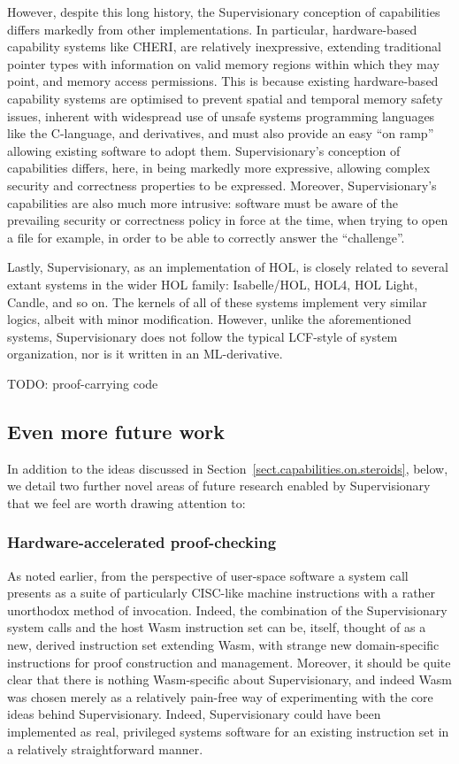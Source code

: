 \documentclass[a4paper, UKenglish, cleveref, autoref, thm-restate, colorlinks]{lipics-v2021}
\newcommand{\todo}[1]{}
\renewcommand{\todo}[1]{{\color{red} TODO: {#1}}}
\begin{document}
However, despite this long history, the Supervisionary conception of capabilities differs markedly from other implementations.
In particular, hardware-based capability systems like CHERI, are relatively inexpressive, extending traditional pointer types with information on valid memory regions within which they may point, and memory access permissions.
This is because existing hardware-based capability systems are optimised to prevent spatial and temporal memory safety issues, inherent with widespread use of unsafe systems programming languages like the C-language, and derivatives, and must also provide an easy ``on ramp'' allowing existing software to adopt them.
Supervisionary's conception of capabilities differs, here, in being markedly more expressive, allowing complex security and correctness properties to be expressed.
Moreover, Supervisionary's capabilities are also much more intrusive: software must be aware of the prevailing security or correctness policy in force at the time, when trying to open a file for example, in order to be able to correctly answer the ``challenge''.

Lastly, Supervisionary, as an implementation of HOL, is closely related to several extant systems in the wider HOL family: Isabelle/HOL, HOL4, HOL Light, Candle, and so on.
The kernels of all of these systems implement very similar logics, albeit with minor modification.
However, unlike the aforementioned systems, Supervisionary does not follow the typical LCF-style of system organization, nor is it written in an ML-derivative.

\todo{proof-carrying code}

\subsection{Even more future work}
\label{subsect.future.work}

In addition to the ideas discussed in Section~\ref{sect.capabilities.on.steroids}, below, we detail two further novel areas of future research enabled by Supervisionary that we feel are worth drawing attention to:

\subsubsection*{Hardware-accelerated proof-checking}

As noted earlier, from the perspective of user-space software a system call presents as a suite of particularly CISC-like machine instructions with a rather unorthodox method of invocation.
Indeed, the combination of the Supervisionary system calls and the host Wasm instruction set can be, itself, thought of as a new, derived instruction set extending Wasm, with strange new domain-specific instructions for proof construction and management.
Moreover, it should be quite clear that there is nothing Wasm-specific about Supervisionary, and indeed Wasm was chosen merely as a relatively pain-free way of experimenting with the core ideas behind Supervisionary.
Indeed, Supervisionary could have been implemented as real, privileged systems software for an existing instruction set in a relatively straightforward manner.
\end{document}
